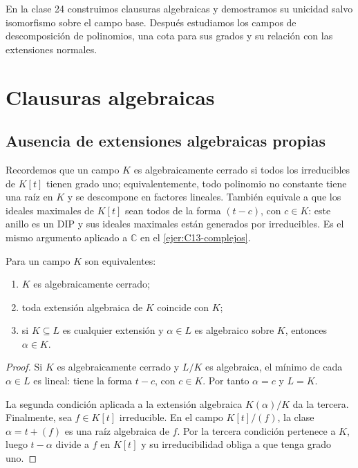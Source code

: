 En la clase 24 construimos clausuras algebraicas y demostramos su unicidad salvo isomorfismo sobre el campo base. Después estudiamos los campos de descomposición de polinomios, una cota para sus grados y su relación con las extensiones normales.

\section{Clausuras algebraicas}
\subsection{Ausencia de extensiones algebraicas propias}
Recordemos que un campo $K$ es algebraicamente cerrado si todos los irreducibles de $K[t]$ tienen grado uno; equivalentemente, todo polinomio no constante tiene una raíz en $K$ y se descompone en factores lineales. También equivale a que los ideales maximales de $K[t]$ sean todos de la forma $(t-c)$, con $c\in K$: este anillo es un DIP y sus ideales maximales están generados por irreducibles. Es el mismo argumento aplicado a $\mathbb C$ en el \cref{ejer:C13-complejos}.

\begin{lema}\label{lema:C24-cerrado}
Para un campo $K$ son equivalentes:
\begin{enumerate}[nosep]
\item $K$ es algebraicamente cerrado;
\item toda extensión algebraica de $K$ coincide con $K$;
\item si $K\subseteq L$ es cualquier extensión y $\alpha\in L$ es algebraico sobre $K$, entonces $\alpha\in K$.
\end{enumerate}
\end{lema}
\begin{proof}
Si $K$ es algebraicamente cerrado y $L/K$ es algebraica, el mínimo de cada $\alpha\in L$ es lineal: tiene la forma $t-c$, con $c\in K$. Por tanto $\alpha=c$ y $L=K$.

La segunda condición aplicada a la extensión algebraica $K(\alpha)/K$ da la tercera. Finalmente, sea $f\in K[t]$ irreducible. En el campo $K[t]/(f)$, la clase $\alpha=t+(f)$ es una raíz algebraica de $f$. Por la tercera condición pertenece a $K$, luego $t-\alpha$ divide a $f$ en $K[t]$ y su irreducibilidad obliga a que tenga grado uno.
\end{proof}


